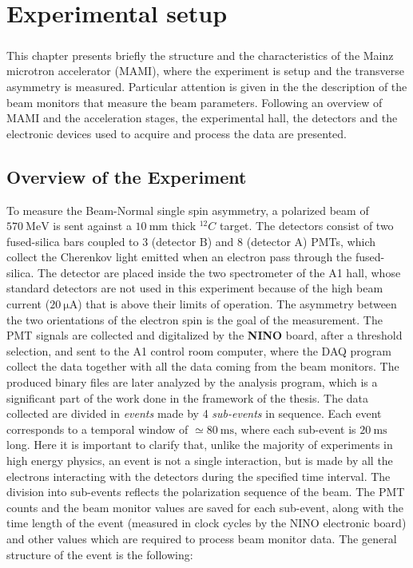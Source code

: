 \chapter{Experimental setup} 

\paragraph{} This chapter presents briefly the structure and the characteristics of the Mainz microtron accelerator (MAMI), where the experiment is setup and the transverse asymmetry is measured. Particular attention is given in the the description of the beam monitors that measure the beam parameters. Following an overview of MAMI and the acceleration stages, the experimental hall, the detectors and the electronic devices used to acquire and process the data are presented. 

\section{Overview of the Experiment} \label{FirstDescription}

To measure the Beam-Normal single spin asymmetry, a polarized beam of $ \SI{570}{\mega \electronvolt}$ is sent against a $\SI{10}{\milli \meter}$ thick $^{12}C$ target. The detectors consist of two fused-silica bars coupled to 3 (detector B) and 8 (detector A) PMTs, which collect the Cherenkov light emitted when an electron pass through the fused-silica. 
The detector are placed inside the two spectrometer of the A1 hall, whose standard detectors are not used in this experiment because of the high beam current ($ \SI{20}{\micro \ampere}$) that is above their limits of operation. 
The asymmetry between the two orientations of the electron spin is the goal of the measurement. The PMT signals are collected and digitalized by the \textbf{NINO} board, after a threshold selection, and sent to the A1 control room computer, where the DAQ program collect the data together with all the data coming from the beam monitors. The produced  binary files are later analyzed by the analysis program, which is a significant part of the work done in the framework of the thesis. 
The data collected are divided in \textit{events} made by 4 \textit{sub-events} in sequence. Each event corresponds to a temporal window of $\simeq \SI{80}{\milli \second}$, where each sub-event is $\SI{20}{\milli \second}$ long.
Here it is important to clarify that, unlike the majority of experiments in high energy physics, an event is not a single interaction, but is made by all the electrons interacting with the detectors during the specified time interval. The division into sub-events reflects the polarization sequence of the beam. The PMT counts and the beam monitor values are saved for each sub-event, along with the time length of the event (measured in clock cycles by the NINO electronic board) and other values which are required to process beam monitor data.
The general structure of the event is the following: 

